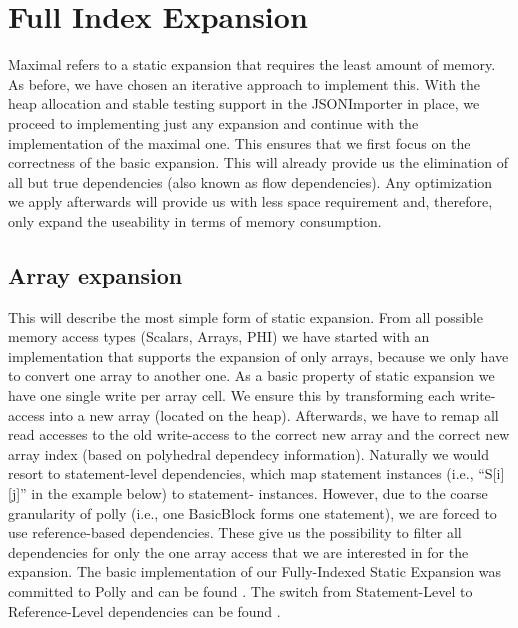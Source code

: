 \chapter{Full Index Expansion}\label{ch:FIE}
Maximal refers to a static expansion that requires the least amount of memory. As before, we have chosen an iterative approach to implement this. With the heap allocation and stable testing support in the JSONImporter in place, we proceed to implementing just any expansion and continue with the implementation of the maximal one. This ensures that we first focus on the correctness of the basic expansion. This will already provide us the elimination of all but true dependencies (also known as flow dependencies). Any optimization we apply afterwards will provide us with less space requirement and, therefore, only expand the useability in terms of memory consumption.

\section{Array expansion}
This will describe the most simple form of static expansion. From all possible memory access types (Scalars, Arrays, PHI) we have started with an implementation that supports the expansion of only arrays, because we only have to convert one array to another one. As a basic property of static expansion we have one single write per array cell. We ensure this by transforming each write-access into a new array (located on the heap). Afterwards, we have to remap all read accesses to the old write-access to the correct new array and the correct new array index (based on polyhedral dependecy information). Naturally we would resort to statement-level dependencies, which map statement instances (i.e., “S[i][j]” in the example below) to statement- instances. However, due to the coarse granularity of polly (i.e., one BasicBlock forms one statement), we are forced to use reference-based dependencies. These give us the possibility to filter all dependencies for only the one array access that we are interested in for the expansion. The basic implementation of our Fully-Indexed Static Expansion was committed to Polly and can be found . The switch from Statement-Level to Reference-Level dependencies can be found .


